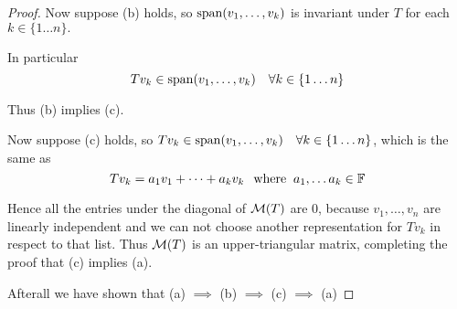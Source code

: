 \begin{proof}
  Now suppose (b) holds, so $\operatorname{span} (v_1, \ldots, v_k)$ is invariant under $T$ for each $k \in \{1 \ldots n\}.$

  In particular
  \begin{equation}
    T v_k \in \operatorname{span} (v_1, \ldots, v_k) \quad \forall k \in \{1 \ldots n\}
  \end{equation}

  Thus (b) implies (c).

  Now suppose (c) holds, so $T v_k \in \operatorname{span} (v_1, \ldots, v_k) \quad \forall k \in \{1 \ldots n\}$, which is the same as
  \begin{equation}
    T v_k = a_1 v_1 + \cdots + a_k v_k \;\;\, \text{where}\;\; a_1, \dots a_k \in \mathbb{F}
  \end{equation}

  Hence all the entries under the diagonal of $\mathcal{M} (T)$ are $0$, because $v_1, \ldots, v_n$ are linearly independent and we can not choose another representation for $T v_k$ in respect to that list. Thus $\mathcal{M}(T)$ is an upper-triangular matrix, completing the proof that (c) implies (a).

  Afterall we have shown that (a) $\implies$ (b) $\implies$ (c) $\implies$ (a)
\end{proof}

